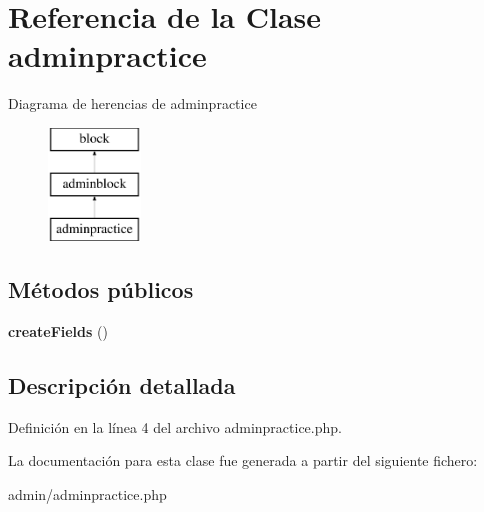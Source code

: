 \hypertarget{classadminpractice}{\section{\-Referencia de la \-Clase adminpractice}
\label{classadminpractice}
}
\-Diagrama de herencias de adminpractice\begin{figure}[H]
\begin{center}
\leavevmode
\includegraphics[height=3.000000cm]{classadminpractice}
\end{center}
\end{figure}
\subsection*{\-Métodos públicos}
\begin{DoxyCompactItemize}
\item 
\hypertarget{classadminpractice_a515878cf8a80e619382e2b0e142353db}{{\bfseries create\-Fields} ()}\label{classadminpractice_a515878cf8a80e619382e2b0e142353db}

\end{DoxyCompactItemize}


\subsection{\-Descripción detallada}


\-Definición en la línea 4 del archivo adminpractice.\-php.



\-La documentación para esta clase fue generada a partir del siguiente fichero\-:\begin{DoxyCompactItemize}
\item 
admin/adminpractice.\-php\end{DoxyCompactItemize}
